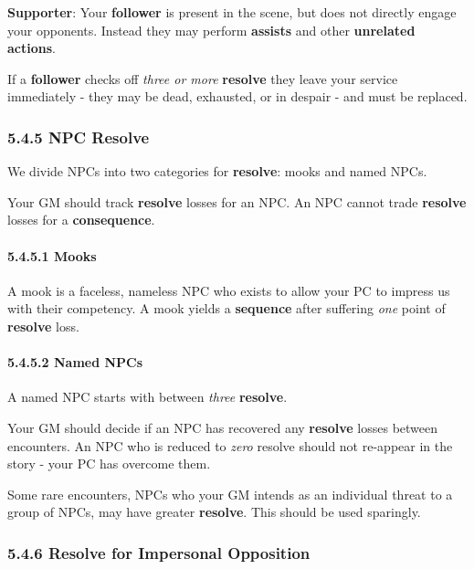 \documentclass[
  11pt,
]{article}
\begin{document}
\textbf{Supporter}: Your \textbf{follower} is present in the scene, but
does not directly engage your opponents. Instead they may perform
\textbf{assists} and other \textbf{unrelated actions}.

If a \textbf{follower} checks off \emph{three or more} \textbf{resolve}
they leave your service immediately - they may be dead, exhausted, or in
despair - and must be replaced.

\hypertarget{npc-resolve}{%
\subsubsection{5.4.5 NPC Resolve}\label{npc-resolve}}

We divide NPCs into two categories for \textbf{resolve}: mooks and named
NPCs.

Your GM should track \textbf{resolve} losses for an NPC. An NPC cannot
trade \textbf{resolve} losses for a \textbf{consequence}.

\hypertarget{mooks}{%
\paragraph{5.4.5.1 Mooks}\label{mooks}}

A mook is a faceless, nameless NPC who exists to allow your PC to
impress us with their competency. A mook yields a \textbf{sequence}
after suffering \emph{one} point of \textbf{resolve} loss.

\hypertarget{named-npcs}{%
\paragraph{5.4.5.2 Named NPCs}\label{named-npcs}}

A named NPC starts with between \emph{three} \textbf{resolve}.

Your GM should decide if an NPC has recovered any \textbf{resolve}
losses between encounters. An NPC who is reduced to \emph{zero} resolve
should not re-appear in the story - your PC has overcome them.

Some rare encounters, NPCs who your GM intends as an individual threat
to a group of NPCs, may have greater \textbf{resolve}. This should be
used sparingly.

\hypertarget{resolve-for-impersonal-opposition}{%
\subsubsection{5.4.6 Resolve for Impersonal
Opposition}\label{resolve-for-impersonal-opposition}}
\end{document}
